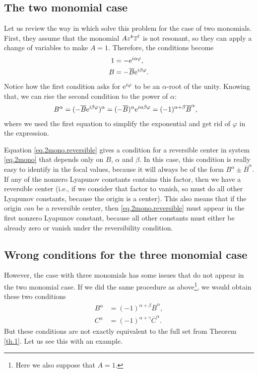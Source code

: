 \subsection{The two monomial case}


Let us review the way in which \citeauthor{Gasull2016} solve this problem for the case of two monomials. First, they assume that the monomial $Az^k\overline{z}^{\ell}$ is not resonant, so they can apply a change of variables to make $A=1$. Therefore, the conditions become
\begin{align*}
1 &= -\mathrm{e}^{i \alpha \varphi},\\
B &= -\overline B\mathrm{e}^{i \beta \varphi}.
\end{align*}
Notice how the first condition asks for $\mathrm{e}^{i \varphi}$ to be an $\alpha$-root of the unity. Knowing that, we can rise the second condition to the power of $\alpha$:
\begin{align}
B^\alpha&=(-\overline B\mathrm{e}^{i \beta \varphi})^\alpha = (-\overline B)^\alpha\mathrm{e}^{i \alpha \beta \varphi} = (-1)^{\alpha+\beta}\overline B^\alpha,
\label{eq.2mono.reversible}
\end{align}
where we used the first equation to simplify the exponential and get rid of $\varphi$ in the expression.

Equation \eqref{eq.2mono.reversible} gives a condition for a reversible center in system \eqref{eq.2mono} that depends only on $B$, $\alpha$ and $\beta$. In this case, this condition is really easy to identify in the focal values, because it will always be of the form $B^\alpha\pm \overline B^\alpha$. If any of the nonzero Lyapunov constants contains this factor, then we have a reversible center (i.e., if we consider that factor to vanish, so must do all other Lyapunov constants, because the origin is a center). This also means that if the origin \emph{can} be a reversible center, then \eqref{eq.2mono.reversible} must appear in the first nonzero Lyapunov constant, because all other constants must either be already zero or vanish under the reversibility condition.


\subsection{Wrong conditions for the three monomial case}

However, the case with three monomials has some issues that do not appear in the two monomial case. If we did the same procedure as above\footnote{Here we also suppose that $A=1$.}, we would obtain these two conditions
\begin{align}
B^\alpha &= (-1)^{\alpha+\beta}\overline B^\alpha,
\label{eq.wrong.cond1}\\
C^\alpha &= (-1)^{\alpha+\gamma}\overline C^\alpha.
\label{eq.wrong.cond2}
\end{align}
But these conditions are not exactly equivalent to the full set from Theorem \ref{th.1}. Let us see this with an example.


